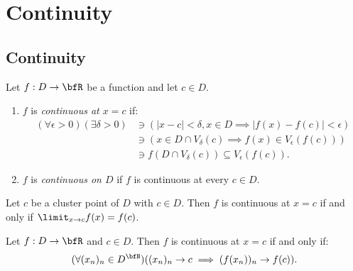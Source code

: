 \chapter{Continuity}

\section{Continuity}
    \begin{definition}
        Let $f:D \rightarrow \bfR$ be a function and let $c \in D$. 
            \begin{enumerate}[label = (\arabic*)]
                \item $f$ is \textit{continuous at $x = c$} if:
                    \begin{equation*}
                    \begin{split}
                        (\forall \epsilon > 0)(\exists \delta >0) &\ni ( |x-c| < \delta, x \in D \implies |f(x) - f(c)| < \epsilon) \\
                        &\ni (x \in D \cap V_\delta(c) \implies f(x) \in V_\epsilon(f(c))) \\
                        & \ni f(D \cap V_\delta(c)) \subseteq V_\epsilon(f(c)).
                    \end{split}
                    \end{equation*}
                \item $f$ is \textit{continuous on $D$} if $f$ is continuous at every $c \in D$.
            \end{enumerate}
    \end{definition}

    \begin{proposition}
        Let $c$ be a cluster point of $D$ with $c \in D$. Then $f$ is continuous at $x = c$ if and only if $\limit_{x \rightarrow c}f(x) = f(c)$.
    \end{proposition}

    \begin{proposition}\label{prop:cont-seq}
        Let $f:D \rightarrow \bfR$ and $c \in D$. Then $f$ is continuous at $x = c$ if and only if:
            \begin{equation*}
            \begin{split}
                (\forall (x_n)_n \in D^\bfN)((x_n)_n \rightarrow c \implies (f(x_n))_n \rightarrow f(c)).
            \end{split}
            \end{equation*}
    \end{proposition}

